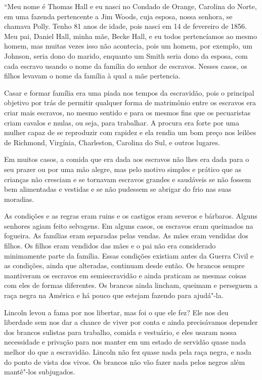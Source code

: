 ``Meu nome é Thomas Hall e eu nasci no Condado de Orange, Carolina do
Norte, em uma fazenda pertencente a Jim Woods, cuja esposa, nossa
senhora, se chamava Polly. Tenho 81 anos de idade, pois nasci em 14 de
fevereiro de 1856. Meu pai, Daniel Hall, minha mãe, Becke Hall, e eu
todos pertencíamos ao mesmo homem, mas muitas vezes isso não acontecia,
pois um homem, por exemplo, um Johnson, seria dono do marido, enquanto
um Smith seria dono da esposa, com cada escravo usando o nome da família
do senhor de escravos. Nesses casos, os filhos levavam o nome da família
à qual a mãe pertencia.

Casar e formar família era uma piada nos tempos da escravidão, pois o
principal objetivo por trás de permitir qualquer forma de matrimônio
entre os escravos era criar mais escravos, no mesmo sentido e para os
mesmos fins que os pecuaristas criam cavalos e mulas, ou seja, para
trabalhar. A procura era forte por uma mulher capaz de se reproduzir com
rapidez e ela rendia um bom preço nos leilões de Richmond, Virgínia,
Charleston, Carolina do Sul, e outros lugares.

Em muitos casos, a comida que era dada aos escravos não lhes era dada
para o seu prazer ou por uma mão alegre, mas pelo motivo simples e
prático que as crianças não cresciam e se tornavam escravos grandes e
saudáveis se não fossem bem alimentadas e vestidas e se não pudessem se
abrigar do frio nas suas moradias.

As condições e as regras eram ruins e os castigos eram severos e
bárbaros. Alguns senhores agiam feito selvagens. Em alguns casos, os
escravos eram queimados na fogueira. As famílias eram separadas pelas
vendas. As mães eram vendidas dos filhos. Os filhos eram vendidos das
mães e o pai não era considerado minimamente parte da família. Essas
condições existiam antes da Guerra Civil e as condições, ainda que
alteradas, continuam desde então. Os brancos sempre mantiveram os
escravos em semiescravidão e ainda praticam as mesmas coisas com eles de
formas diferentes. Os brancos ainda lincham, queimam e perseguem a raça
negra na América e há pouco que estejam fazendo para ajudá"-la.

Lincoln levou a fama por nos libertar, mas foi o que ele fez? Ele nos
deu liberdade sem nos dar a chance de viver por conta e ainda
precisávamos depender dos brancos sulistas para trabalho, comida e
vestuário, e eles usaram nossa necessidade e privação para nos manter em
um estado de servidão quase nada melhor do que a escravidão. Lincoln não
fez quase nada pela raça negra, e nada do ponto de vista dos vivos. Os
brancos não vão fazer nada pelos negros além mantê"-los subjugados.

